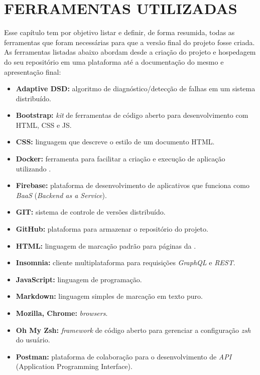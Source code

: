 
\chapter{FERRAMENTAS UTILIZADAS}
\label{chap:ferramentas_utilizadas}

Esse capítulo tem por objetivo listar e definir, de forma resumida, todas as ferramentas que foram necessárias para que a versão final do projeto fosse criada. As ferramentas listadas abaixo abordam desde a criação do projeto e hospedagem do seu repositório em uma plataforma \online{} até a documentação do mesmo e apresentação final:

\begin{itemize}
    \item \textbf{Adaptive DSD:} algoritmo de diagnóstico/detecção de falhas em um sistema distribuído. 
    \item \textbf{Bootstrap:} \textit{kit} de ferramentas de código aberto para desenvolvimento com HTML, CSS e JS.
    \item \textbf{CSS:} linguagem que descreve o estilo de um documento HTML.
    \item \textbf{Docker:} ferramenta para facilitar a criação e execução de aplicação utilizando \containers{}.
    \item \textbf{Firebase:} plataforma de desenvolvimento de aplicativos que funciona como \textit{BaaS} (\textit{Backend as a Service}).
    \item \textbf{GIT:} sistema de controle de versões distribuído.
    \item \textbf{GitHub:} plataforma \online{} para armazenar o repositório do projeto.
    \item \textbf{HTML:} linguagem de marcação padrão para páginas da \web{}.
    \item \textbf{Insomnia:} cliente multiplataforma para requisições \textit{GraphQL} e \textit{REST}. 
    \item \textbf{JavaScript:} linguagem de programação.
    \item \textbf{Markdown:} linguagem simples de marcação em texto puro.
    \item \textbf{Mozilla, Chrome:} \textit{browsers}.
    \item \textbf{Oh My Zsh:} \textit{framework} de código aberto para gerenciar a configuração \textit{zsh} do usuário.
    \item \textbf{Postman:} plataforma de colaboração para o desenvolvimento de \textit{API} (Application Programming Interface).

\end{itemize}
